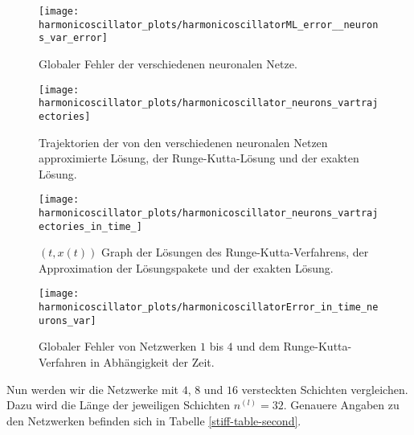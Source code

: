 \begin{figure}
       \centering
       \texttt{[image: harmonicoscillator\_plots/harmonicoscillatorML\_error\_\_neurons\_var\_error]}
       \caption{Globaler Fehler der verschiedenen neuronalen Netze.}
       \label{fig:harmonic-neurons-variable-error}
\end{figure}
\begin{figure}
       \centering
       \texttt{[image: harmonicoscillator\_plots/harmonicoscillator\_neurons\_vartrajectories]}
       \caption{Trajektorien der von den verschiedenen neuronalen Netzen approximierte Lösung, der Runge-Kutta-Lösung
       und der exakten Lösung.}
       \label{fig:harmonic-neurons-variable-trajectories}
\end{figure}
\begin{figure}
       \centering
       \texttt{[image: harmonicoscillator\_plots/harmonicoscillator\_neurons\_vartrajectories\_in\_time\_]}
       \caption{$(t,x(t))$ Graph der Lösungen des Runge-Kutta-Verfahrens, der Approximation der
       Lösungspakete und der exakten Lösung.}
       \label{fig:harmonic-neurons-variable-trajectories-in-time}
\end{figure}
\begin{figure}
       \centering
       \texttt{[image: harmonicoscillator\_plots/harmonicoscillatorError\_in\_time\_neurons\_var]}
       \caption{Globaler Fehler von Netzwerken $1$ bis $4$ und dem Runge-Kutta-Verfahren in Abhängigkeit der Zeit.}
       \label{fig:harmonic-neurons-variable-error-in-time}
\end{figure}
\clearpage
Nun werden wir die Netzwerke mit $4$, $8$ und $16$ versteckten Schichten vergleichen. Dazu wird die Länge der jeweiligen
Schichten $n^{(l)}=32$. Genauere Angaben zu den Netzwerken befinden sich in Tabelle \ref{stiff-table-second}.
